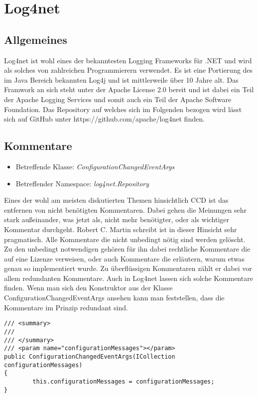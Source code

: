 \section{Log4net}
\subsection{Allgemeines}
Log4net ist wohl eines der bekanntesten Logging Frameworks für .NET und wird als solches von zahlreichen Programmierern verwendet. Es ist eine Portierung des im Java Bereich bekannten Log4j und ist mittlerweile über 10 Jahre alt. Das Framwork an sich steht unter der Apache License 2.0 bereit und ist dabei ein Teil der Apache Logging Services und somit auch ein Teil der Apache Software Foundation. Das Repository auf welches sich im Folgenden bezogen wird lässt sich auf GitHub unter https://github.com/apache/log4net finden.

\subsection{Kommentare}
\begin{itemize}
	\item Betreffende Klasse: \textit{ConfigurationChangedEventArgs}
	\item Betreffender Namespace: \textit{log4net.Repository}
\end{itemize}

Eines der wohl am meisten diskutierten Themen hinsichtlich CCD ist das entfernen von nicht benötigten Kommentaren. Dabei gehen die Meinungen sehr stark außeinander, was jetzt als, nicht mehr benötigter, oder als wichtiger Kommentar durchgeht. Robert C. Martin schreibt ist in dieser Hinsicht sehr pragmatisch. Alle Kommentare die nicht unbedingt nötig sind werden gelöscht. Zu den unbedingt notwendigen gehören für ihn dabei rechtliche Kommentare die auf eine Lizenze verweisen, oder auch Kommentare die erläutern, warum etwas genau so implementiert wurde. Zu überflüssigen Kommentaren zählt er dabei vor allem redundanten Kommentare. Auch in Log4net lassen sich solche Kommentare finden. Wenn man sich den Konstruktor aus der Klasse ConfigurationChangedEventArgs ansehen kann man feststellen, dass die Kommentare im Prinzip redundant sind.

\begin{lstlisting}[language={[Sharp]C}, caption=Beispiele für überflüssige Kommentare, label=lst:RedundantComment]
/// <summary>
/// 
/// </summary>
/// <param name="configurationMessages"></param>
public ConfigurationChangedEventArgs(ICollection configurationMessages)
{
		this.configurationMessages = configurationMessages;
}
\end{lstlisting}

